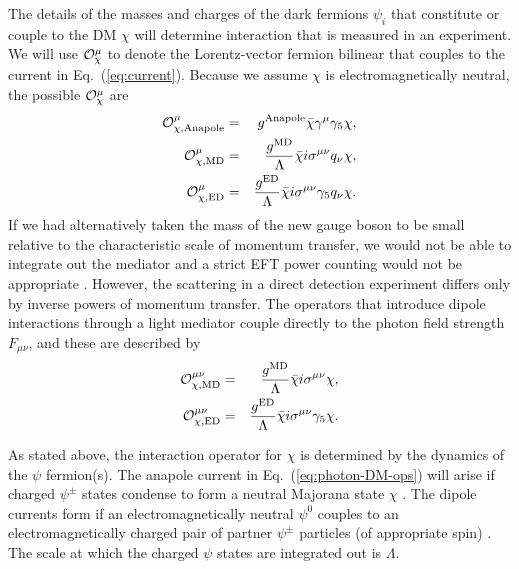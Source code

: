 \documentclass[11pt]{article}
\newcommand{\Eq}[1]{Eq.~(\ref{#1})} \newcommand{\Eqs}[2]{Eqs.~(\ref{#1}) and (\ref{#2})} \newcommand{\Eqm}[2]{Eqs.~(\ref{#1}) through (\ref{#2})}
\begin{document}
The details of the masses and charges of the dark fermions $\psi_i$ that constitute or couple to the DM $\chi$ will determine interaction that is measured in an experiment. We will use ${\cal O}_\chi^\mu$ to denote the Lorentz-vector fermion bilinear that couples to the current in \Eq{eq:current}. Because we assume $\chi$ is electromagnetically neutral, the possible ${\cal O}_\chi^\mu$ are \cite{Gresham:2014vja, Gluscevic:2015sqa}
\begin{eqnarray} \label{eq:photon-DM-ops}
{\cal O}_{\rm \chi, Anapole}^\mu & = & g^{\rm Anapole}\bar \chi \gamma^\mu \gamma_5 \chi, \\
{\cal O}_{\rm \chi, MD}^\mu & = & \frac{g^{\rm MD}}{\Lambda}\bar \chi i \sigma^{\mu \nu} q_\nu \chi ,\\
{\cal O}_{\rm \chi, ED}^\mu & = & \frac{g^{\rm ED}}{\Lambda} \bar \chi i \sigma^{\mu \nu} \gamma_5 q_\nu \chi.
\end{eqnarray}
If we had alternatively taken the mass of the new gauge boson to be small relative to the characteristic scale of momentum transfer, we would not be able to integrate out the mediator and a strict EFT power counting would not be appropriate \cite{Fitzpatrick:2012ix}. However, the scattering in a direct detection experiment differs only by inverse powers of momentum transfer. The operators that introduce dipole interactions through a light mediator couple directly to the photon field strength $F_{\mu \nu}$, and these are described by
\begin{eqnarray} \label{eq:photon-DM-ops2}
{\cal O}_{\rm \chi, MD}^{\mu \nu} & = & \frac{g^{\rm MD}}{\Lambda} \bar \chi i \sigma^{\mu \nu}  \chi ,\\
{\cal O}_{\rm \chi, ED}^{\mu \nu} & = & \frac{g^{\rm ED}}{\Lambda} \bar \chi i \sigma^{\mu \nu} \gamma_5 \chi.
\end{eqnarray}

As stated above, the interaction operator for $\chi$ is determined by the dynamics of the $\psi$ fermion(s). The anapole current in \Eq{eq:photon-DM-ops} will arise if charged $\psi^\pm$ states condense to form a neutral Majorana state $\chi$ \cite{Bagnasco:1993st}. The dipole currents form if an electromagnetically neutral $\psi^0$ couples to an electromagnetically charged pair of partner $\psi^\pm$ particles (of appropriate spin) \cite{Weiner:2012gm}. The scale at which the charged $\psi$ states are integrated out is $\Lambda$.
\end{document}
